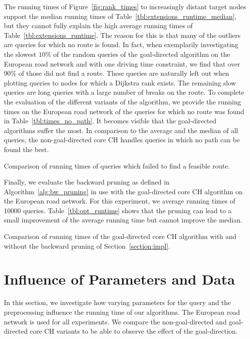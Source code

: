 The running times of Figure~\ref{fig:rank_times} to increasingly distant target nodes support the median running times of Table~\ref{tbl:extensions_runtime_median}, but they cannot fully explain the high average running times of Table~\ref{tbl:extensions_runtime}. The reason for this is that many of the outliers are queries for which no route is found. In fact, when exemplarily investigating the slowest $10\%$ of the random queries of the goal-directed algorithm on the European road network and with one driving time constraint, we find that over $90\%$ of those did not find a route. These queries are naturally left out when plotting queries to nodes for which a Dijkstra rank exists. The remaining slow queries are long queries with a large number of breaks on the route. To complete the evaluation of the different variants of the algorithm, we provide the running times on the European road network of the queries for which no route was found in Table~\ref{tbl:times_no_path}. It becomes visible that the goal-directed algorithms suffer the most. In comparison to the average and the median of all queries, the non-goal-directed core CH handles queries in which no path can be found the best.

\begin{table}[hbtp]
	\centering
	
	\caption{Comparison of running times of queries which failed to find a feasible route.}
	\label{tbl:times_no_path}
\end{table}

Finally, we evaluate the backward pruning as defined in Algorithm~\ref{alg:bw_pruning} in use with the goal-directed core CH algorithm on the European road network. For this experiment, we average running times of \num{10000} queries. Table~\ref{tbl:opt_runtime} shows that the pruning can lead to a small improvement of the average running time but cannot improve the median.

\begin{table}[hbtp]
	\centering
	
	\caption{Comparison of running times of the goal-directed core CH algorithm with and without the backward pruning of Section~\ref{section:impl}.}
	\label{tbl:opt_runtime}
\end{table}

\section{Influence of Parameters and Data}
In this section, we investigate how varying parameters for the query and the preprocessing influence the running time of our algorithms. The European road network is used for all experiments. We compare the non-goal-directed and goal-directed core CH variants to be able to observe the effect of the goal-direction.

